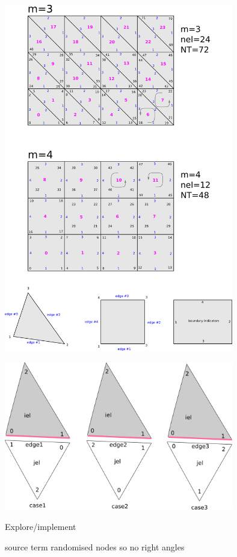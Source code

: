 

\begin{center}
\includegraphics[width=10cm]{python_codes/fieldstone_79/images/grids2D}
\end{center}

\begin{center}
\includegraphics[width=10cm]{python_codes/fieldstone_79/images/drawing}
\end{center}



Explore/implement

source term
randomised nodes so no right angles

